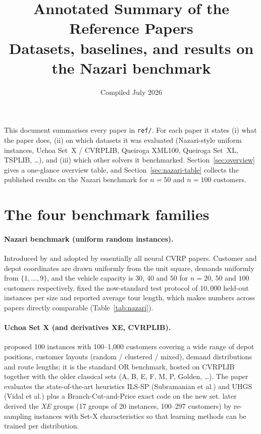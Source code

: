 \documentclass[11pt]{article}
\title{Annotated Summary of the Reference Papers\\
\large Datasets, baselines, and results on the Nazari benchmark}
\author{}
\date{Compiled July 2026}
\begin{document}
\maketitle

\noindent This document summarises every paper in \texttt{ref/}. For each paper it states
(i) what the paper does, (ii) on which datasets it was evaluated (Nazari-style uniform
instances, Uchoa Set~X / CVRPLIB, Queiroga XML100, Queiroga Set~XL, TSPLIB, \dots), and
(iii) which other solvers it benchmarked. Section~\ref{sec:overview} gives a one-glance
overview table, and Section~\ref{sec:nazari-table} collects the published results on the
Nazari benchmark for $n=50$ and $n=100$ customers.

\section{The four benchmark families}
\label{sec:benchmarks}

\paragraph{Nazari benchmark (uniform random instances).}
Introduced by \citet{nazari_reinforcement_2018} and adopted by essentially all neural CVRP
papers. Customer and depot coordinates are drawn uniformly from the unit square, demands
uniformly from $\{1,\dots,9\}$, and the vehicle capacity is $30$, $40$ and $50$ for $n=20$,
$50$ and $100$ customers respectively. \citet{kool_attention_2018} fixed the now-standard
test protocol of $10{,}000$ held-out instances per size and reported average tour length,
which makes numbers across papers directly comparable (Table~\ref{tab:nazari}).

\paragraph{Uchoa Set X (and derivatives XE, CVRPLIB).}
\citet{uchoa_new_2017} proposed 100 instances with 100--1{,}000 customers covering a wide
range of depot positions, customer layouts (random / clustered / mixed), demand
distributions and route lengths; it is the standard OR benchmark, hosted on CVRPLIB
together with the older classical sets (A, B, E, F, M, P, Golden, \dots). The paper
evaluates the state-of-the-art heuristics ILS-SP (Subramanian et al.) and UHGS (Vidal et
al.) plus a Branch-Cut-and-Price exact code on the new set.
\citet{hottung_andre_neural_2020} later derived the \emph{XE} groups (17 groups of 20
instances, 100--297 customers) by re-sampling instances with Set-X characteristics so that
learning methods can be trained per distribution.
\end{document}
